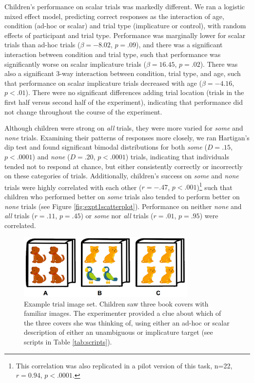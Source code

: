 \documentclass[10pt,letterpaper]{article}
\begin{document}
Children's performance on scalar trials was markedly different. We ran a logistic mixed effect model, predicting correct responses as the interaction of age, condition (ad-hoc or scalar) and trial type (implicature or control), with random effects of participant and trial type. Performance was marginally lower for scalar trials than ad-hoc trials ($\beta = -8.02$, $p =.09$), and there was a significant interaction between condition and trial type, such that performance was significantly worse on scalar implicature trials ($\beta = 16.45$, $p = .02$).  There was also a significant 3-way interaction between condition, trial type, and age, such that performance on scalar implicature trials decreased with age ($\beta = -4.16$, $p < .01$). There were no significant differences adding trial location (trials in the first half versus second half of the experiment), indicating that performance did not change throughout the course of the experiment.

Although children were strong on \emph{all} trials, they were more varied for \emph{some} and \emph{none} trials.  Examining their patterns of responses more closely, we ran Hartigan's dip test and found significant bimodal distributions for both \emph{some} ($D=.15$, $p<.0001$) and \emph{none} ($D=.20$, $p<.0001$) trials, indicating that individuals tended not to respond at chance, but either consistently correctly or incorrectly on these categories of trials. Additionally, children's success on \emph{some} and \emph{none} trials were highly correlated with each other ($r=-.47$, $p<.001$)\footnote{This correlation was also replicated in a pilot version of this task, n=22, $r=0.94$, $p<.0001$.} such that children who performed better on \emph{some} trials also tended to perform better on \emph{none} trials (see Figure \ref{fig:expt1scatterplot}). Performance on neither \emph{none} and \emph{all} trials ($r=.11$, $p=.45$) or \emph{some} nor \emph{all} trials ($r=.01$, $p=.95$) were correlated.

 \begin{figure}[h] 
  \begin{center} 
    \includegraphics[width=3.5in]{figures/implicatures_demo_letters.png} 
    \caption{\label{fig:demo} Example trial image set. Children saw three book covers with familiar images. The experimenter provided a clue about which of the three covers she was thinking of, using either an ad-hoc or scalar description of either an unambiguous or implicature target (see scripts in Table \ref{tab:scripts}).}
    \end{center} 
\end{figure}
\end{document}
